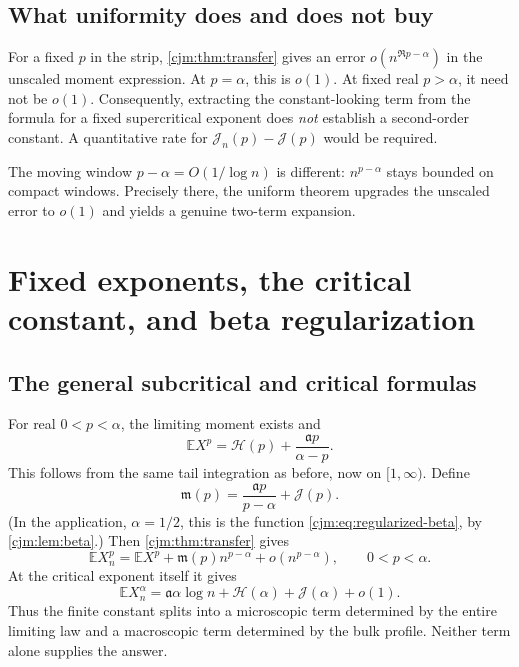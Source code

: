 \documentclass[11pt,a4paper]{article}
\theoremstyle{definition}\newaliascnt{definition}{theorem}
\theoremstyle{remark}\newaliascnt{remark}{theorem}
\newcommand{\ljE}{\mathbb E}
\begin{document}
\subsection{What uniformity does and does not buy}
For a fixed $p$ in the strip, \cref{cjm:thm:transfer} gives an error
$o(n^{\Re p-\alpha})$ in the unscaled moment expression. At $p=\alpha$,
this is $o(1)$. At fixed real $p>\alpha$, it need not be $o(1)$.
Consequently, extracting the constant-looking term from the formula for a
fixed supercritical exponent does \emph{not} establish a second-order
constant. A quantitative rate for $\mathcal J_n(p)-\mathcal J(p)$ would be
required.

The moving window $p-\alpha=O(1/\log n)$ is different:
$n^{p-\alpha}$ stays bounded on compact windows. Precisely there, the
uniform theorem upgrades the unscaled error to $o(1)$ and yields a genuine
two-term expansion.

\section{Fixed exponents, the critical constant, and beta regularization}
\label{cjm:sec:constants}

\subsection{The general subcritical and critical formulas}
For real $0<p<\alpha$, the limiting moment exists and
\begin{equation}
 \ljE X^p=\mathcal H(p)+\frac{\mathfrak a p}{\alpha-p}.
 \label{cjm:eq:limit-moment}
\end{equation}
This follows from the same tail integration as before, now on $[1,\infty)$.
Define
\begin{equation}
 \mathfrak m(p)=\frac{\mathfrak a p}{p-\alpha}+\mathcal J(p).
 \label{cjm:eq:K-general}
\end{equation}
(In the application, $\alpha=1/2$, this is the function
\eqref{cjm:eq:regularized-beta}, by \cref{cjm:lem:beta}.) Then
\cref{cjm:thm:transfer} gives
\begin{equation}
 \ljE X_n^p=\ljE X^p+\mathfrak m(p)n^{p-\alpha}
                          +o(n^{p-\alpha}),\qquad0<p<\alpha.
 \label{cjm:eq:subcritical-general}
\end{equation}
At the critical exponent itself it gives
\begin{equation}
 \ljE X_n^\alpha=\mathfrak a\alpha\log n+\mathcal H(\alpha)+\mathcal J(\alpha)+o(1).
 \label{cjm:eq:critical-general}
\end{equation}
Thus the finite constant splits into a microscopic term determined by the
entire limiting law and a macroscopic term determined by the bulk profile.
Neither term alone supplies the answer.
\end{document}
